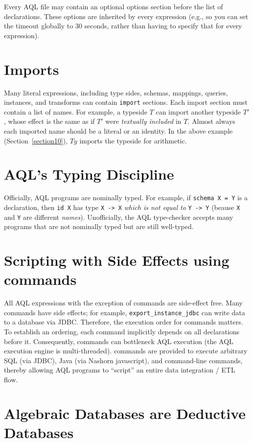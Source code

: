 \documentclass[10pt]{book}
\begin{document}
Every AQL file may contain an optional options section before the list of declarations.  These options are inherited by every expression (e.g., so you can set the timeout globally to 30 seconds, rather than having to specify that for every expression).  

\section{Imports}

Many literal expressions, including type sides, schemas, mappings, queries, instances, and transforms can contain {\tt import} sections.  Each import section must contain a list of names.  For example, a typeside $T$ can import another typeside $T'$, whose effect is the same as if $T'$ were {\it textually included} in $T$.  Almost always each imported name should be a literal or an identity.  In the above example (Section~\ref{section10}), $Ty$ imports the typeside for arithmetic.
 
\section{AQL's Typing Discipline}

Officially, AQL programs are nominally typed.  For example, if {\tt schema X = Y} is a declaration, then {\tt id X} has type {\tt X -> X} {\it which is not equal to} {\tt Y -> Y} (beause {\tt X} and {\tt Y} are different {\it names}).  Unofficially, the AQL type-checker accepts many programs that are not nominally typed but are still well-typed.

\section{Scripting with Side Effects using commands}

All AQL expressions with the exception of commands are side-effect free.  Many commands have side effects; for example, {\tt export\_instance\_jdbc} can write data to a database via JDBC.  Therefore, the execution order for commands matters.  To establish an ordering, each command implicitly depends on all declarations before it.  Consequently, commands can bottleneck AQL execution (the AQL execution engine is multi-threaded).  commands are provided to execute arbitrary SQL (via JDBC), Java (via Nashorn javascript), and command-line commands, thereby allowing AQL programs to ``script'' an entire data integration / ETL flow.

\section{Algebraic Databases are Deductive Databases}
\end{document}
